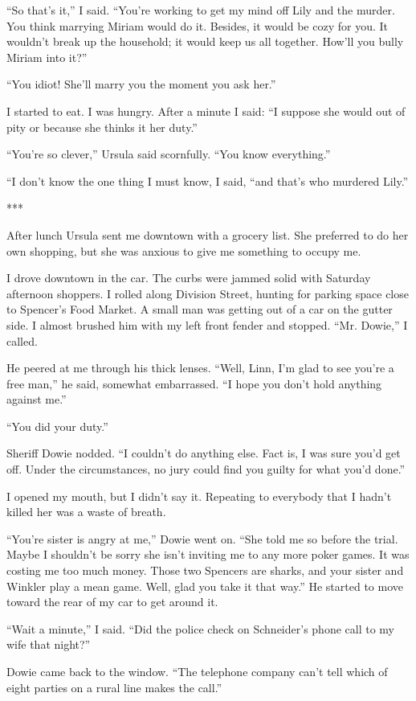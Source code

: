 {“So that’s it,” I said. “You’re working to get my mind off Lily and the murder. You think marrying Miriam would do it. Besides, it would be cozy for you. It wouldn’t break up the household; it would keep us all together. How’ll you bully Miriam into it?”

“You idiot! She’ll marry you the moment you ask her.”

I started to eat. I was hungry. After a minute I said: “I suppose she would out of pity or because she thinks it her duty.”

“You’re so clever,” Ursula said scornfully. “You know everything.”

“I don’t know the one thing I must know, I said, “and that’s who murdered Lily.”

***

After lunch Ursula sent me downtown with a grocery list. She preferred to do her own shopping, but she was anxious to give me something to occupy me.

I drove downtown in the car. The curbs were jammed solid with Saturday afternoon shoppers. I rolled along Division Street, hunting for parking space close to Spencer’s Food Market. A small man was getting out of a car on the gutter side. I almost brushed him with my left front fender and stopped. “Mr. Dowie,” I called.

He peered at me through his thick lenses. “Well, Linn, I’m glad to see you’re a free man,” he said, somewhat embarrassed. “I hope you don’t hold anything against me.”

“You did your duty.”

Sheriff Dowie nodded. “I couldn’t do anything else. Fact is, I was sure you’d get off. Under the circumstances, no jury could find you guilty for what you’d done.”

I opened my mouth, but I didn’t say it. Repeating to everybody that I hadn’t killed her was a waste of breath.

“You’re sister is angry at me,” Dowie went on. “She told me so before the trial. Maybe I shouldn’t be sorry she isn’t inviting me to any more poker games. It was costing me too much money. Those two Spencers are sharks, and your sister and Winkler play a mean game. Well, glad you take it that way.” He started to move toward the rear of my car to get around it.

“Wait a minute,” I said. “Did the police check on Schneider’s phone call to my wife that night?”

Dowie came back to the window. “The telephone company can’t tell which of eight parties on a rural line makes the call.”

}
